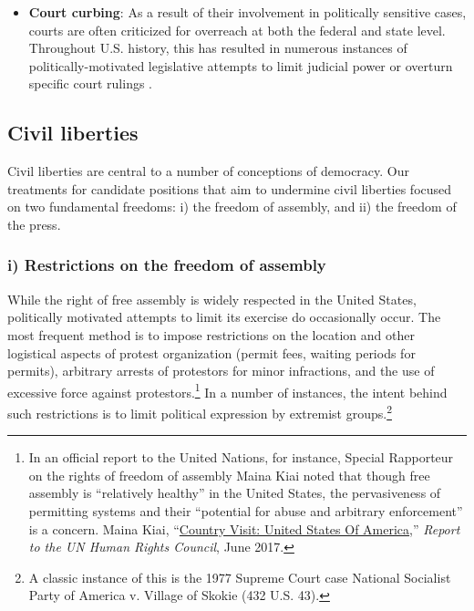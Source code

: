 \documentclass[12pt]{article}
\begin{document}
\begin{itemize}
\item \textbf{Court curbing}: As a result of their involvement in politically sensitive cases, courts are often criticized for overreach at both the federal and state level. Throughout U.S. history, this has resulted in numerous instances of politically-motivated legislative attempts to limit judicial power or overturn specific court rulings \citep{Clark2010,Kramer2004}.

\end{itemize}


\subsection{Civil liberties}

Civil liberties are central to a number of conceptions of democracy. Our treatments for candidate positions that aim to undermine civil liberties focused on two fundamental freedoms: i) the freedom of assembly, and ii) the freedom of the press.

\subsubsection*{i) Restrictions on the freedom of assembly}

While the right of free assembly is widely respected in the United States, politically motivated attempts to limit its exercise do occasionally occur. The most frequent method is to impose restrictions on the location and other logistical aspects of protest organization (permit fees, waiting periods for permits), arbitrary arrests of protestors for minor infractions, and the use of excessive force against protestors.\footnote{In an official report to the United Nations, for instance, Special Rapporteur on the rights of freedom of assembly Maina Kiai noted that though free assembly is ``relatively healthy'' in the United States, the pervasiveness of permitting systems and their ``potential for abuse and arbitrary enforcement'' is a concern. Maina Kiai, ``\href{http://freeassembly.net/reports/usa/}{Country Visit: United States Of America},'' \emph{Report to the UN Human Rights Council}, June 2017.} In a number of instances, the intent behind such restrictions is to limit political expression by extremist groups.\footnote{A classic instance of this is the 1977 Supreme Court case National Socialist Party of America v. Village of Skokie (432 U.S. 43).}
\end{document}
